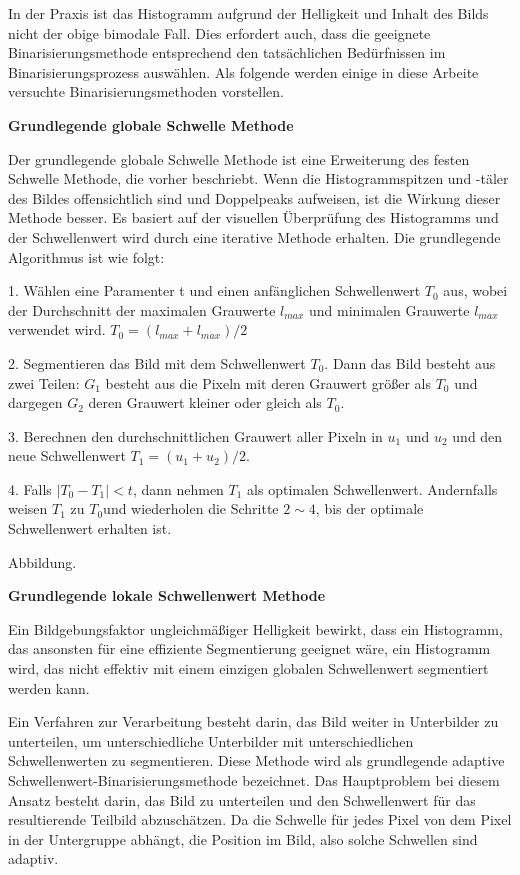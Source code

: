 In der Praxis ist das Histogramm aufgrund der Helligkeit und Inhalt des Bilds nicht der obige bimodale Fall. Dies erfordert auch, dass die geeignete Binarisierungsmethode entsprechend den tatsächlichen Bedürfnissen im Binarisierungsprozess auswählen. Als folgende werden einige in diese Arbeite versuchte Binarisierungsmethoden vorstellen.

\textbf{Grundlegende globale Schwelle Methode}

Der grundlegende globale Schwelle Methode ist eine Erweiterung des festen Schwelle Methode, die vorher beschriebt. Wenn die Histogrammspitzen und -täler des Bildes offensichtlich sind und Doppelpeaks aufweisen, ist die Wirkung dieser Methode besser. Es basiert auf der visuellen Überprüfung des Histogramms und der Schwellenwert wird durch eine iterative Methode erhalten. Die grundlegende Algorithmus ist wie folgt:

1. Wählen eine Paramenter t und einen anfänglichen Schwellenwert $ T_{0} $ aus, wobei der Durchschnitt der maximalen Grauwerte $ l_{max} $ und minimalen Grauwerte  $ l_{max} $ verwendet wird. $ T_{0} = (l_{max}+l_{max})/2 $

2. Segmentieren das Bild mit dem Schwellenwert $ T_{0} $. Dann das Bild besteht aus zwei Teilen: $ G_{1} $ besteht aus die Pixeln mit deren Grauwert größer als $ T_{0} $ und dargegen $ G_{2} $ deren Grauwert kleiner oder gleich als $ T_{0} $.

3. Berechnen den durchschnittlichen Grauwert aller Pixeln in $ u_{1} $ und $ u_{2} $ und den neue Schwellenwert $ T_{1} = (u_{1}+u_{2})/2 $.

4. Falls $ |T_{0} - T_{1}| < t $, dann nehmen $ T_{1} $ als optimalen Schwellenwert. Andernfalls weisen $ T_{1} $ zu $ T_{0} $und wiederholen die Schritte $ 2\sim4 $, bis der optimale Schwellenwert erhalten ist.

Abbildung. 

\textbf{Grundlegende lokale Schwellenwert Methode}

Ein Bildgebungsfaktor ungleichmäßiger Helligkeit bewirkt, dass ein Histogramm, das ansonsten für eine effiziente Segmentierung geeignet wäre, ein Histogramm wird, das nicht effektiv mit einem einzigen globalen Schwellenwert segmentiert werden kann.

Ein Verfahren zur Verarbeitung besteht darin, das Bild weiter in Unterbilder zu unterteilen, um unterschiedliche Unterbilder mit unterschiedlichen Schwellenwerten zu segmentieren. Diese Methode wird als grundlegende adaptive Schwellenwert-Binarisierungsmethode bezeichnet. Das Hauptproblem bei diesem Ansatz besteht darin, das Bild zu unterteilen und den Schwellenwert für das resultierende Teilbild abzuschätzen. Da die Schwelle für jedes Pixel von dem Pixel in der Untergruppe abhängt, die Position im Bild, also solche Schwellen sind adaptiv. 

